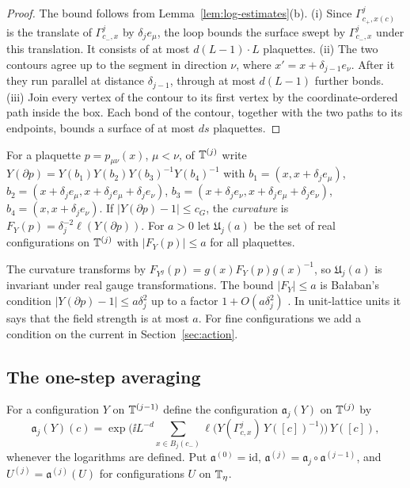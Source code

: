\begin{proof}
The bound follows from Lemma~\ref{lem:log-estimates}(b). (i) Since $\Gamma^j_{c_+,x(c)}$ is the translate of $\Gamma^j_{c_-,x}$ by $\delta_je_\mu$, the loop bounds the surface swept by $\Gamma^j_{c_-,x}$ under this translation. It consists of at most $d(L-1)\cdot L$ plaquettes. (ii) The two contours agree up to the segment in direction $\nu$, where $x'=x+\delta_{j-1}e_\nu$. After it they run parallel at distance $\delta_{j-1}$, through at most $d(L-1)$ further bonds. (iii) Join every vertex of the contour to its first vertex by the coordinate-ordered path inside the box. Each bond of the contour, together with the two paths to its endpoints, bounds a surface of at most $ds$ plaquettes.
\end{proof}

\begin{definition}\label{def:curvature}
For a plaquette $p=p_{\mu\nu}(x)$, $\mu<\nu$, of $\mathbb T^{(j)}$ write $Y(\partial p)=Y(b_1)Y(b_2)Y(b_3)^{-1}Y(b_4)^{-1}$ with $b_1=(x,x+\delta_je_\mu)$, $b_2=(x+\delta_je_\mu,x+\delta_je_\mu+\delta_je_\nu)$, $b_3=(x+\delta_je_\nu,x+\delta_je_\mu+\delta_je_\nu)$, $b_4=(x,x+\delta_je_\nu)$. If $|Y(\partial p)-1|\le c_G$, the \emph{curvature} is $F_Y(p)=\delta_j^{-2}\ell(Y(\partial p))$. For $a>0$ let $\mathfrak U_j(a)$ be the set of real configurations on $\mathbb T^{(j)}$ with $|F_Y(p)|\le a$ for all plaquettes.
\end{definition}

The curvature transforms by $F_{Y^g}(p)=g(x)F_Y(p)g(x)^{-1}$, so $\mathfrak U_j(a)$ is invariant under real gauge transformations. The bound $|F_Y|\le a$ is Ba\l aban's condition $|Y(\partial p)-1|\le a\delta_j^2$ up to a factor $1+O(a\delta_j^2)$ \cite[(1.7)]{BalReg}. In unit-lattice units it says that the field strength is at most $a$. For fine configurations we add a condition on the current in Section~\ref{sec:action}.

\subsection{The one-step averaging}

\begin{definition}\label{def:one-step}
For a configuration $Y$ on $\mathbb T^{(j-1)}$ define the configuration $\mathfrak a_j(Y)$ on $\mathbb T^{(j)}$ by
\[
\mathfrak a_j(Y)(c)=\exp\Big(\ii L^{-d}\sum_{x\in B_j(c_-)}\ell\big(Y(\Gamma^j_{c,x})\,Y([c])^{-1}\big)\Big)\,Y([c]),
\]
whenever the logarithms are defined. Put $\mathfrak a^{(0)}=\mathrm{id}$, $\mathfrak a^{(j)}=\mathfrak a_j\circ\mathfrak a^{(j-1)}$, and $U^{(j)}=\mathfrak a^{(j)}(U)$ for configurations $U$ on $\mathbb T_\eta$.
\end{definition}

